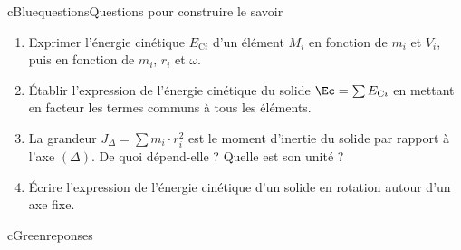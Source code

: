 \begin{rub}{cBlue}{questions}{Questions pour construire le savoir}
\begin{enumerate}
  \item {} Exprimer l’énergie cinétique $E_{\mathrm{C}i}$ d’un élément $M_i$ en fonction de $m_i$ et $V_i$, puis en fonction de $m_i$, $r_i$ et $\omega$.
  \item {} Établir l’expression de l’énergie cinétique du solide $\Ec = \sum E_{\mathrm{C}i}$ en mettant en facteur les termes communs à tous les éléments.
  \item {} La grandeur $J_\Delta = \sum m_i\cdot r_i^2$ est le moment d’inertie du solide par rapport à l’axe $(\Delta)$. De quoi dépend-elle ? Quelle est son unité ?
  \item {} Écrire l’expression de l’énergie cinétique d’un solide en rotation autour d’un axe fixe.
\end{enumerate}
\end{rub}

\begin{rub}{cGreen}{reponses}{\titrereponses}
\begin{reps}
  \item {}
  \item {}
  \item {}
  \item {}
\end{reps}
\end{rub}

